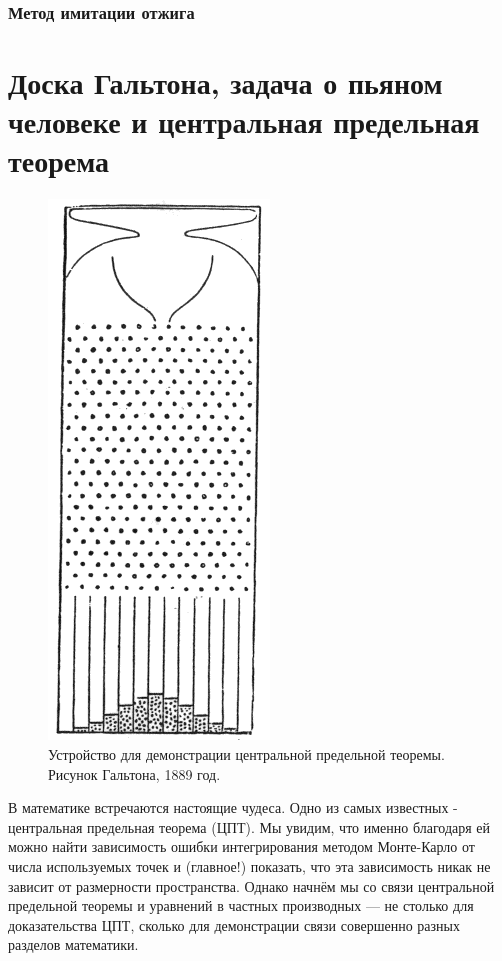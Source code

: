 \documentclass{book}
\begin{document}
\clearpage

\subsubsection{Метод имитации отжига}

\clearpage

\section{Доска Гальтона, задача о пьяном человеке и центральная предельная теорема}

\begin{figure}
	\includegraphics{Galton_board.png}
    \caption{\label{Galton_board}Устройство для демонстрации центральной предельной
    теоремы. Рисунок Гальтона, 1889 год.}
\end{figure}

В математике встречаются настоящие чудеса. Одно из самых известных - центральная предельная теорема
(ЦПТ). Мы увидим, что именно благодаря ей можно найти зависимость ошибки интегрирования методом
Монте-Карло от числа используемых точек и (главное!) показать, что эта зависимость никак не зависит
от размерности пространства. Однако начнём мы со связи центральной предельной теоремы и уравнений в
частных производных --- не столько для доказательства ЦПТ, сколько для демонстрации связи
совершенно разных разделов математики.
\end{document}
